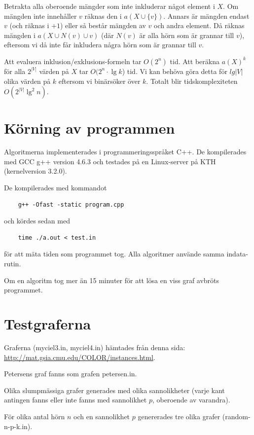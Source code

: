 \documentclass[a4paper]{report}
\begin{document}
Betrakta alla oberoende mängder som inte inkluderar något element i $X$. Om mängden inte innehåller $v$ räknas den i $a(X \cup \{v\})$. Annars är mängden endast $v$ (och räknas i $+1$)
eller så består mängden av $v$ och andra element. Då räknas mängden i $a(X \cup N(v) \cup v)$ (där $N(v)$ är alla hörn som är grannar till $v$), eftersom vi då inte får inkludera
några hörn som är grannar till $v$.

Att evaluera inklusion/exklusions-formeln tar $O(2^n)$ tid. Att beräkna $a(X)^k$ för alla $2^{|V|}$  värden på $X$ tar $O(2^n \cdot \lg k$) tid. Vi kan behöva
göra detta för $lg |V|$ olika värden på $k$ eftersom vi binärsöker över $k$. Totalt blir tidskomplexiteten $O(2^|V| \lg^2 n)$.

\chapter{Körning av programmen}
Algoritmerna implementerades i programmeringsspråket C++. De kompilerades med GCC g++ version 4.6.3 och testades på en Linux-server på KTH (kernelversion 3.2.0).

De kompilerades med kommandot
\begin{verbatim}
    g++ -Ofast -static program.cpp
\end{verbatim}

och kördes sedan med

\begin{verbatim}
    time ./a.out < test.in
\end{verbatim}

för att mäta tiden som programmet tog. Alla algoritmer använde samma indata-rutin.

Om en algoritm tog mer än 15 minuter för att lösa en viss graf avbröts programmet.

\chapter{Testgraferna}
Graferna (myciel3.in, myciel4.in) hämtades från denna sida: \url{http://mat.gsia.cmu.edu/COLOR/instances.html}.

Petersens graf fanns som grafen petersen.in.

Olika slumpmässiga grafer generades med olika sannolikheter (varje kant antingen fanns eller inte fanns med sannolikhet $p$, oberoende av varandra).

För olika antal hörn $n$ och en sannolikhet $p$ genererades tre olika grafer (random-n-p-k.in).
\end{document}
